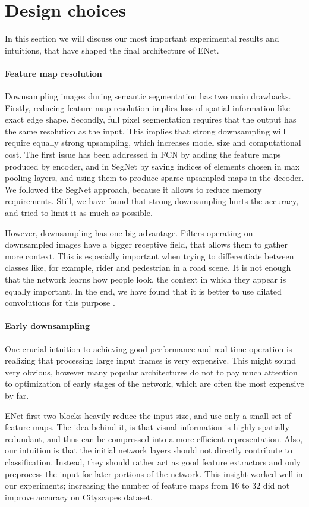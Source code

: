 \documentclass{article}
\begin{document}
\section{Design choices} \label{design}
In this section we will discuss our most important experimental results and intuitions, that have shaped the final architecture of ENet.

\paragraph{Feature map resolution}
Downsampling images during semantic segmentation has two main drawbacks.
Firstly, reducing feature map resolution implies loss of spatial information like exact edge shape.
Secondly, full pixel segmentation requires that the output has the same resolution as the input.
This implies that strong downsampling will require equally strong upsampling, which increases model size and computational cost.
The first issue has been addressed in FCN \cite{long15} by adding the feature maps produced by encoder, and in SegNet \cite{badrinarayanan15basic} by saving indices of elements chosen in max pooling layers, and using them to produce sparse upsampled maps in the decoder.
We followed the SegNet approach, because it allows to reduce memory requirements.
Still, we have found that strong downsampling hurts the accuracy, and tried to limit it as much as possible.

However, downsampling has one big advantage.
Filters operating on downsampled images have a bigger receptive field, that allows them to gather more context.
This is especially important when trying to differentiate between classes like, for example, rider and pedestrian in a road scene.
It is not enough that the network learns how people look, the context in which they appear is equally important.
In the end, we have found that it is better to use dilated convolutions for this purpose \cite{yu2015dilated}.

\paragraph{Early downsampling}
One crucial intuition to achieving good performance and real-time operation is realizing that processing large input frames is very expensive.
This might sound very obvious, however many popular architectures do not to pay much attention to optimization of early stages of the network, which are often the most expensive by far.

ENet first two blocks heavily reduce the input size, and use only a small set of feature maps.
The idea behind it, is that visual information is highly spatially redundant, and thus can be compressed into a more efficient representation.
Also, our intuition is that the initial network layers should not directly contribute to classification.
Instead, they should rather act as good feature extractors and only preprocess the input for later portions of the network.
This insight worked well in our experiments; increasing the number of feature maps from $16$ to $32$ did not improve accuracy on Cityscapes \cite{cityscape2016} dataset.
\end{document}
